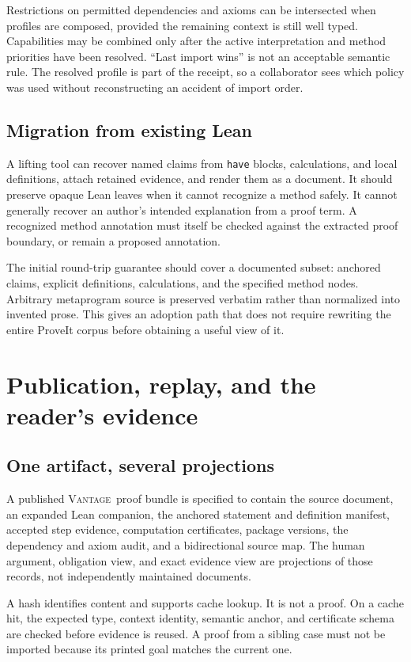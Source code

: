\documentclass[11pt,a4paper]{article}
\newcommand{\code}[1]{\nolinkurl{#1}}
\newcommand{\Vantage}{\textsc{Vantage}}
\theoremstyle{definition}
\begin{document}
Restrictions on permitted dependencies and axioms can be intersected when profiles
are composed, provided the remaining context is still well typed. Capabilities
may be combined only after the active interpretation and method priorities have
been resolved. ``Last import wins'' is not an acceptable semantic rule. The
resolved profile is part of the receipt, so a collaborator sees which policy was
used without reconstructing an accident of import order.

\subsection{Migration from existing Lean}
A lifting tool can recover named claims from \code{have} blocks, calculations,
and local definitions, attach retained evidence, and render them as a document.
It should preserve opaque Lean leaves when it cannot recognize a method safely.
It cannot generally recover an author's intended explanation from a proof term.
A recognized method annotation must itself be checked against the extracted
proof boundary, or remain a proposed annotation.

The initial round-trip guarantee should cover a documented subset: anchored
claims, explicit definitions, calculations, and the specified method nodes.
Arbitrary metaprogram source is preserved verbatim rather than normalized into
invented prose. This gives an adoption path that does not require rewriting the
entire ProveIt corpus before obtaining a useful view of it.

\section{Publication, replay, and the reader's evidence}\label{sec:replay}
\subsection{One artifact, several projections}
A published \Vantage\ proof bundle is specified to contain the source document, an expanded Lean companion,
the anchored statement and definition manifest, accepted step evidence, computation
certificates, package versions, the dependency and axiom audit, and a bidirectional
source map. The human argument, obligation view, and exact evidence view are
projections of those records, not independently maintained documents.

A hash identifies content and supports cache lookup. It is not a proof. On a
cache hit, the expected type, context identity, semantic anchor, and certificate
schema are checked before evidence is reused. A proof from a sibling case must
not be imported because its printed goal matches the current one.
\end{document}
